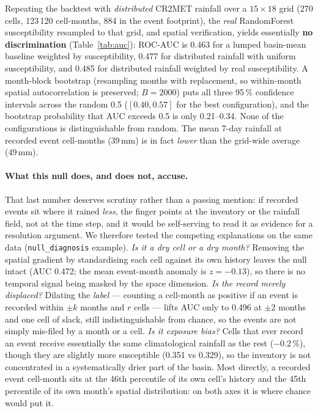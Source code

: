 \documentclass[authoryear,preprint,review,12pt]{elsarticle}
\begin{document}
Repeating the backtest with \emph{distributed} CR2MET rainfall over a
$15\times18$ grid (270 cells, 123\,120 cell-months, 884 in the event footprint),
the \emph{real} RandomForest susceptibility resampled to that grid, and spatial
verification, yields essentially \textbf{no discrimination}
(Table~\ref{tab:auc}): ROC-AUC is 0.463 for a lumped basin-mean baseline
weighted by susceptibility, 0.477 for distributed rainfall with uniform
susceptibility, and 0.485 for distributed rainfall weighted by real
susceptibility. A month-block bootstrap (resampling months with replacement, so
within-month spatial autocorrelation is preserved; $B=2000$) puts all three 95\,\%
confidence intervals across the random 0.5 ($[0.40, 0.57]$ for the best
configuration), and the bootstrap probability that AUC exceeds 0.5 is only
0.21--0.34. None of the configurations is distinguishable from random. The mean
7-day rainfall at recorded event cell-months (39\,mm) is in fact \emph{lower}
than the grid-wide average (49\,mm).

\paragraph{What this null does, and does not, accuse.}
That last number deserves scrutiny rather than a passing mention: if recorded
events sit where it rained \emph{less}, the finger points at the inventory or the
rainfall field, not at the time step, and it would be self-serving to read it as
evidence for a resolution argument. We therefore tested the competing explanations
on the same data (\texttt{null\_diagnosis} example). \emph{Is it a dry cell or a dry
month?} Removing the spatial gradient by standardising each cell against its own
history leaves the null intact (AUC 0.472; the mean event-month anomaly is
$z=-0.13$), so there is no temporal signal being masked by the space dimension.
\emph{Is the record merely displaced?} Dilating the \emph{label} --- counting a
cell-month as positive if an event is recorded within $\pm k$ months and $r$ cells
--- lifts AUC only to 0.496 at $\pm2$ months and one cell of slack, still
indistinguishable from chance, so the events are not simply mis-filed by a month or
a cell. \emph{Is it exposure bias?} Cells that ever record an event receive
essentially the same climatological rainfall as the rest ($-0.2$\,\%), though they
are slightly more susceptible (0.351 vs 0.329), so the inventory is not
concentrated in a systematically drier part of the basin. Most directly, a recorded
event cell-month sits at the 46th percentile of its own cell's history and the 45th
percentile of its own month's spatial distribution: on both axes it is where chance
would put it.
\end{document}
